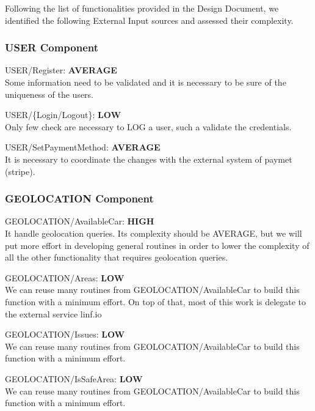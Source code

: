 \documentclass[11pt]{article} %
\newcommand{\extInput}[3]{ #1:  \textbf{#2} \\ #3  }
\begin{document}
Following the list of functionalities provided in the Design Document, we identified the following External Input sources and assessed their complexity.

\subsubsection{USER Component}


\begin{description}
	\item \extInput
		{USER/Register}
		{AVERAGE}
		{Some information need to be validated and it is necessary to be sure of the uniqueness of the users.}
	\item \extInput
		{USER/\{Login/Logout\}}
		{LOW}
		{Only few check are necessary to LOG a user, such a validate the credentials.}
	\item \extInput
		{USER/SetPaymentMethod}
		{AVERAGE}
		{It is necessary to coordinate the changes with the external system of paymet (stripe).}

\end{description}

\subsubsection{GEOLOCATION Component}

\begin{description}
	\item \extInput
		{GEOLOCATION/AvailableCar}
		{HIGH}
		{It handle geolocation queries. Its complexity should be AVERAGE, but we will put more effort in developing general routines in order to lower the complexity of all the other functionality that requires geolocation queries.}
	\item \extInput
		{GEOLOCATION/Areas}
		{LOW}
		{We can reuse many routines from GEOLOCATION/AvailableCar to build this function with a minimum effort. On top of that, most of this work is delegate to the external service linf.io}
	\item \extInput
		{GEOLOCATION/Issues}
		{LOW}
		{We can reuse many routines from GEOLOCATION/AvailableCar to build this function with a minimum effort.}
	\item \extInput
		{GEOLOCATION/IsSafeArea}
		{LOW}
		{We can reuse many routines from GEOLOCATION/AvailableCar to build this function with a minimum effort.}

\end{description}
\end{document}
